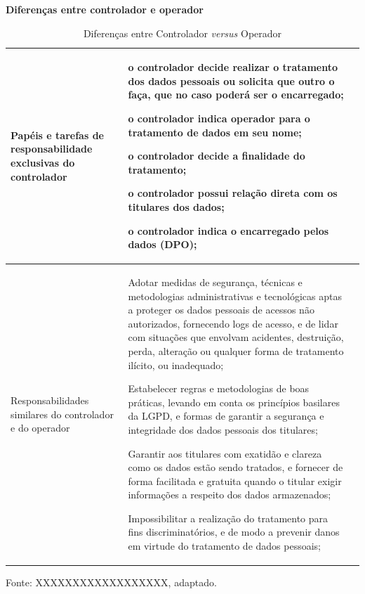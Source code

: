 \documentclass[
	12pt,				%
	openright,			%
	oneside,			%
	a4paper,			%
	english,			%
	french,				%
	spanish,			%
	brazil,				%
	]{abntex2}
\begin{document}
\begin{table}[ht]
    \centering
    \caption{Diferenças entre Controlador \textit{versus} Operador}
    \label{tab: Diferenças entre controlador e operador}
    \textbf{Diferenças entre controlador e operador}  \\ 

    \begin{tabular}{|p{4 cm}|p{11.5cm}|p{0cm}|} 
        \hline

Papéis e tarefas de responsabilidade exclusivas do controlador
&
\begin{tabitemize}
\item o controlador decide realizar o tratamento dos dados pessoais ou solicita que outro o faça, que no caso poderá ser o encarregado;
\item o controlador indica operador para o tratamento de dados em seu nome;
\item o controlador decide a finalidade do tratamento;
\item o controlador possui relação direta com os titulares dos dados;
\item o controlador indica o encarregado pelos dados (DPO);
\end{tabitemize}\\ \hline

Responsabilidades similares do controlador e do operador
&
\begin{tabitemize}
\item Adotar medidas de segurança, técnicas e metodologias administrativas e tecnológicas aptas a proteger os dados pessoais de acessos não autorizados, fornecendo logs de acesso, e de lidar com situações que envolvam acidentes, destruição, perda, alteração ou qualquer forma de tratamento ilícito, ou inadequado;

\item Estabelecer regras e metodologias de boas práticas, levando em conta os princípios basilares da LGPD, e formas de garantir a segurança e integridade dos dados pessoais dos titulares;

\item Garantir aos titulares com exatidão e clareza como os dados estão sendo tratados, e fornecer de forma facilitada e gratuita quando o titular exigir informações a respeito dos dados armazenados;

\item Impossibilitar a realização do tratamento para fins discriminatórios, e de modo a prevenir danos em virtude do tratamento de dados pessoais;

\end{tabitemize}\\ \hline
 
    \end{tabular}
    \newline \newline Fonte: XXXXXXXXXXXXXXXXXX, adaptado.
\end{table}
\end{document}
